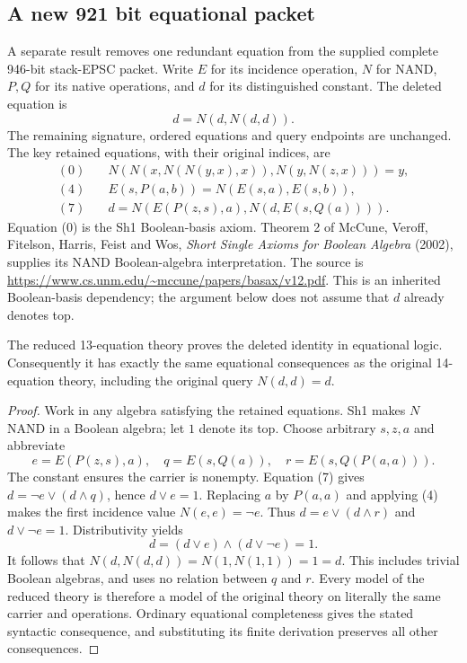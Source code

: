 \subsection{A new 921 bit equational packet}
A separate result removes one redundant equation from the supplied complete 946-bit stack-EPSC packet. Write $E$ for its incidence operation, $N$ for NAND, $P,Q$ for its native operations, and $d$ for its distinguished constant. The deleted equation is
\[
d=N(d,N(d,d)).
\]
The remaining signature, ordered equations and query endpoints are unchanged. The key retained equations, with their original indices, are
\begin{align*}
(0)\quad&N(N(x,N(N(y,x),x)),N(y,N(z,x)))=y,\\
(4)\quad&E(s,P(a,b))=N(E(s,a),E(s,b)),\\
(7)\quad&d=N(E(P(z,s),a),N(d,E(s,Q(a)))).
\end{align*}
Equation (0) is the Sh1 Boolean-basis axiom. Theorem 2 of McCune, Veroff, Fitelson, Harris, Feist and Wos, \emph{Short Single Axioms for Boolean Algebra} (2002), supplies its NAND Boolean-algebra interpretation. The source is \url{https://www.cs.unm.edu/~mccune/papers/basax/v12.pdf}. This is an inherited Boolean-basis dependency; the argument below does not assume that $d$ already denotes top.

\begin{proposition}
The reduced 13-equation theory proves the deleted identity in equational logic. Consequently it has exactly the same equational consequences as the original 14-equation theory, including the original query $N(d,d)=d$.
\end{proposition}
\begin{proof}
Work in any algebra satisfying the retained equations. Sh1 makes $N$ NAND in a Boolean algebra; let $1$ denote its top. Choose arbitrary $s,z,a$ and abbreviate
\[
e=E(P(z,s),a),\quad q=E(s,Q(a)),\quad r=E(s,Q(P(a,a))).
\]
The constant ensures the carrier is nonempty. Equation (7) gives $d=\neg e\vee(d\wedge q)$, hence $d\vee e=1$. Replacing $a$ by $P(a,a)$ and applying (4) makes the first incidence value $N(e,e)=\neg e$. Thus $d=e\vee(d\wedge r)$ and $d\vee\neg e=1$. Distributivity yields
\[
d=(d\vee e)\wedge(d\vee\neg e)=1.
\]
It follows that $N(d,N(d,d))=N(1,N(1,1))=1=d$. This includes trivial Boolean algebras, and uses no relation between $q$ and $r$. Every model of the reduced theory is therefore a model of the original theory on literally the same carrier and operations. Ordinary equational completeness gives the stated syntactic consequence, and substituting its finite derivation preserves all other consequences.
\end{proof}

